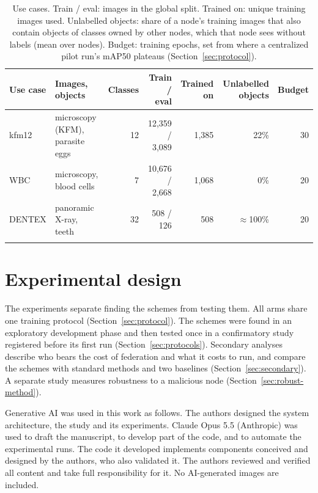 \documentclass[pdflatex,sn-mathphys-num]{sn-jnl}
\begin{document}
\begin{table}[t]
\caption{Use cases. Train / eval: images in the global split. Trained on: unique training images used. Unlabelled objects: share of a node's training images that also contain objects of classes owned by other nodes, which that node sees without labels (mean over nodes). Budget: training epochs, set from where a centralized pilot run's mAP50 plateaus (Section~\ref{sec:protocol}).}\label{tab:datasets}
\footnotesize
\setlength{\tabcolsep}{3.5pt}
\begin{tabular*}{\textwidth}{@{\extracolsep\fill}l>{\raggedright\arraybackslash}p{}rrrrr}
\toprule
Use case & Images, objects & Classes & Train / eval & Trained on & Unlabelled objects & Budget \\
\midrule
kfm12 & microscopy (KFM), parasite eggs & 12 & 12,359 / 3,089 & 1,385 & 22\% & 30 \\
WBC & microscopy, blood cells & 7 & 10,676 / 2,668 & 1,068 & 0\% & 20 \\
DENTEX & panoramic X-ray, teeth & 32 & 508 / 126 & 508 & $\approx$100\% & 20 \\
\botrule
\end{tabular*}
\end{table}

\section{Experimental design}\label{sec:design}

The experiments separate finding the schemes from testing them. All arms share one training protocol (Section~\ref{sec:protocol}). The schemes were found in an exploratory development phase and then tested once in a confirmatory study registered before its first run (Section~\ref{sec:protocols}). Secondary analyses describe who bears the cost of federation and what it costs to run, and compare the schemes with standard methods and two baselines (Section~\ref{sec:secondary}). A separate study measures robustness to a malicious node (Section~\ref{sec:robust-method}).

Generative AI was used in this work as follows. The authors designed the system architecture, the study and its experiments. Claude Opus 5.5 (Anthropic) was used to draft the manuscript, to develop part of the code, and to automate the experimental runs. The code it developed implements components conceived and designed by the authors, who also validated it. The authors reviewed and verified all content and take full responsibility for it. No AI-generated images are included.
\end{document}
